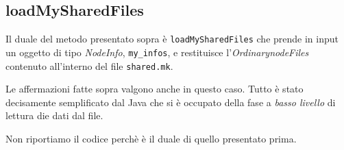 \subsection{loadMySharedFiles}
Il duale del metodo presentato sopra è \verb|loadMySharedFiles| che prende in input un oggetto di tipo \emph{NodeInfo}, \verb|my_infos|, e restituisce l'\emph{OrdinarynodeFiles} contenuto all'interno del file \verb|shared.mk|.

Le affermazioni fatte sopra valgono anche in questo caso. Tutto è stato decisamente semplificato dal Java che si è occupato della fase a \emph{basso livello} di lettura die dati dal file.

Non riportiamo il codice perchè è il duale di quello presentato prima.
